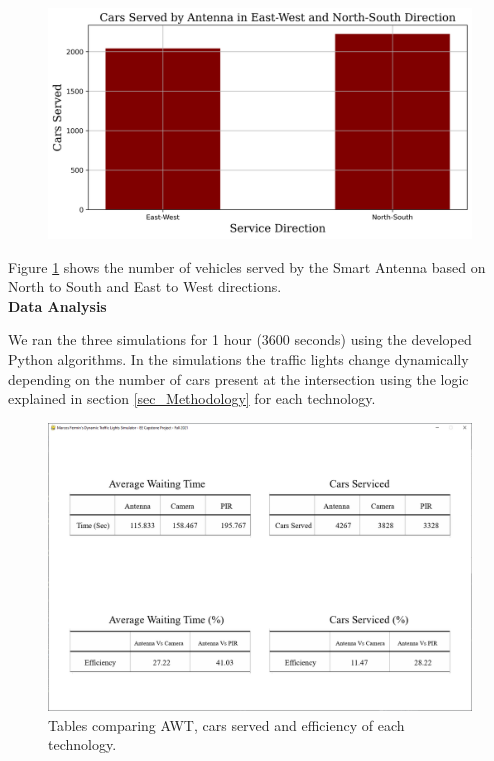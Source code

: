 \documentclass[12pt, a4paper,titlepage]{article}
\begin{document}
\begin{figure}[H]
	\centering
	\includegraphics[width=\linewidth]{images/CarsServed_vs_Servicedirection}
	\caption{}
	\label{fig:carsservedvsservicedirection}
\end{figure}

Figure \ref{fig:carsservedvsservicedirection} shows the number of vehicles served by the Smart Antenna based on North to South and East to West directions.\\

\textbf{Data Analysis}

We ran the three simulations for 1 hour (3600 seconds) using the developed Python algorithms. In the simulations the traffic lights change dynamically depending on the number of cars present at the intersection using the logic explained in section \ref{sec_Methodology} for each technology.

\begin{figure}[H]
	\centering
	\includegraphics[width=\linewidth]{images/Tables}
	\caption{Tables comparing AWT, cars served and efficiency of each technology.}
	\label{fig:tables}
\end{figure}
\end{document}
